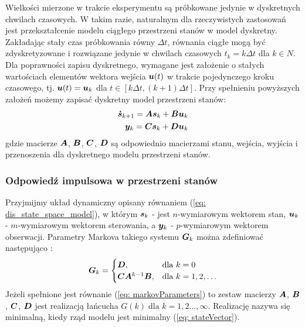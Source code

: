 Wielkości mierzone w trakcie eksperymentu są próbkowane jedynie w dyskretnych chwilach czasowych. W takim razie, naturalnym dla rzeczywistych zastosowań jest przekształcenie modelu ciągłego przestrzeni stanów w model dyskretny. Zakładając stały czas próbkowania równy $\Delta t$, równania ciągłe mogą być zdyskretyzowane i rozwiązane jedynie w chwilach czasowych $t_k=k\Delta t$ dla $k\in N$. Dla poprawności zapisu dyskretnego, wymagane jest założenie o stałych wartościach elementów wektora wejścia $\bm{u}(t)$ w trakcie pojedynczego kroku czasowego, tj. $\bm{u}(t)=\bm{u}_k$ dla $t \in [k\Delta t, (k+1)\Delta t]$. Przy spełnieniu powyższych założeń możemy zapisać dyskretny model przestrzeni stanów:
\begin{equation} \label{eq: dis_state_space_model}
	\begin{aligned}
		\bm{\dot{s}}_{k+1}= \bm{A}\bm{s}_k+\bm{B}\bm{u}_k \\
		\bm{y}_k = \bm{C}\bm{s}_k+\bm{D}\bm{u}_k
	\end{aligned}
\end{equation}
gdzie macierze $\bm{A}$, $\bm{B}$, $\bm{C}$, $\bm{D}$ są odpowiednio macierzami stanu, wejścia, wyjścia i przenoszenia dla dyskretnego modelu przestrzeni stanów.

\subsubsection{Odpowiedź impulsowa w przestrzeni stanów}
Przyjmijmy układ dynamiczny opisany równaniem (\ref{eq: dis_state_space_model}), w którym $\bm{s}_k$ - jest $n$-wymiarowym wektorem stan, $\bm{u}_k$ - $m$-wymiarowym wektorem sterowania, a $\bm{y}_k$ - $p$-wymiarowym wektorem obserwacji. Parametry Markova takiego systemu $\bm{G}_k$ można zdefiniować następująco \parencite{Schutter2000}:
\begin{equation} \label{eq: markovParameters}
	\bm{G}_k= \begin{cases}
		\bm{D}, & \text{dla }k=0 \\
		\bm{C}\bm{A}^{k-1}\bm{B}, & \text{dla }k=1,2, \dots
	\end{cases}
\end{equation}
Jeżeli spełnione jest równanie (\ref{eq: markovParameters}) to zestaw macierzy $\bm{A}$, $\bm{B}$, $\bm{C}$, $\bm{D}$ jest realizacją łańcucha $G(k)\; \text{dla } k=1,2\dots,\infty$. Realizację nazywa się minimalną, kiedy rząd modelu jest minimalny (\ref{eq: stateVector}).


